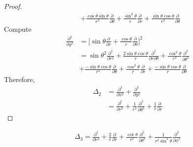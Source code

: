 \documentclass{report}
\begin{document}
\begin{proof}
\begin{align*}
&+ \frac{\cos \theta \sin \theta}{r^2} \frac{\partial }{\partial \theta}+ \frac{\sin ^2 \theta}{r}\frac{\partial }{\partial r} +  \frac{\sin \theta \cos \theta}{r^2} \frac{\partial }{\partial  \theta}
\end{align*}
Compute 
\begin{align*}
\frac{\partial ^2}{\partial y^2}&=\Big[ \sin \theta \frac{\partial }{\partial r}+ \frac{\cos \theta}{r} \frac{\partial }{\partial \theta} \Big]^2 \\
&= \sin \theta^2 \frac{\partial^2 }{\partial r^2} + \frac{2\sin \theta \cos \theta}{r} \frac{\partial^2}{\partial r \partial  \theta} + \frac{\cos ^2 \theta}{r^2} \frac{\partial ^2}{\partial \theta^2} \\
&+ \frac{- \sin \theta \cos \theta}{r^2} \frac{\partial }{\partial \theta}+ \frac{\cos^2 \theta}{r} \frac{\partial }{\partial r}+ \frac{- \sin \theta \cos \theta}{r} \frac{\partial }{\partial \theta}
\end{align*}
Therefore, 
\begin{align*}
\Delta_2&= \frac{\partial ^2}{\partial x^2} + \frac{\partial ^2}{\partial y^2}  \\
&= \frac{\partial ^2}{\partial r^2}+ \frac{1}{r^2} \frac{\partial ^2}{\partial \theta^2} + \frac{1}{r} \frac{\partial }{\partial r}
\end{align*}
\end{proof}
\begin{theorem}
\begin{align*}
\Delta_3 = \frac{\partial ^2}{\partial r^2} + \frac{2}{r} \frac{\partial }{\partial r} + \frac{\cot \theta}{r^2} \frac{\partial ^2}{\partial  \theta^2} + \frac{1}{r^2 \sin ^2 \theta} \frac{\partial ^2}{\partial \phi^2}
\end{align*}
\end{theorem}
\end{document}
